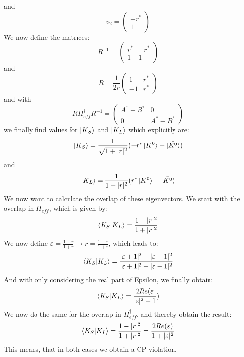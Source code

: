 \documentclass[a4paper]{article}
\begin{document}
and
\begin{equation}
    v_2=\begin{pmatrix}
        -r^* \\
        1
    \end{pmatrix}
\end{equation}
We now define the matrices:
\begin{equation}
    R^{-1}=
  \begin{pmatrix}
        r^* & -r^* \\
        1 & 1
    \end{pmatrix}
\end{equation}
and
\begin{equation}
    R= \frac{1}{2r}
    \begin{pmatrix}
        1 & r^* \\
        -1 & r^*
    \end{pmatrix}
\end{equation}
and with
\begin{equation}
    RH^\dagger_{eff}R^{-1}=
    \begin{pmatrix}
        A^*+B^* & 0 \\
        0 & A^*-B^*
    \end{pmatrix}
\end{equation}
we finally find values for $\ket{K_S}$ and $\ket{K_L}$ which explicitly are:
\begin{equation}
    \ket{K_S}=\frac{1}{\sqrt{1+|r|^2}}(-r^*\ket{K^0}+\ket{\bar{K^0}})
\end{equation}
and
\begin{equation}
    \ket{K_L}=\frac{1}{1+|r|^2}(r^*\ket{K^0}-\ket{\bar{K^0}}
\end{equation}
We now want to calculate the overlap of these eigenvectors. We start with the
overlap in $H_{eff}$, which is given by:
\begin{equation}
    \braket{K_S|K_L}=\frac{1-|r|^2}{1+|r|^2}
\end{equation}
We now define $\varepsilon=\frac{1-r}{1+r}\rightarrow r=\frac{1-\varepsilon}{1+\varepsilon}$, which leads to:
\begin{equation}
    \braket{K_S|K_L}=\frac{|\varepsilon+1|^2-|\varepsilon-1|^2}{|\varepsilon+1|^2+|\varepsilon-1|^2}
\end{equation}
And with only considering the real part of Epsilon, we finally obtain:
\begin{equation}
    \braket{K_S|K_L}=\frac{2Re(\varepsilon}{|\varepsilon|^2+1})
\end{equation}
We now do the same for the overlap in $H^\dagger_{eff}$, and thereby obtain the result:
\begin{equation}
    \braket{K_S|K_L}=\frac{1-|r|^2}{1+|r|^2}=\frac{2Re(\varepsilon)}{1+|\varepsilon|^2}
\end{equation}
This means, that in both cases we obtain a CP-violation.
\end{document}
